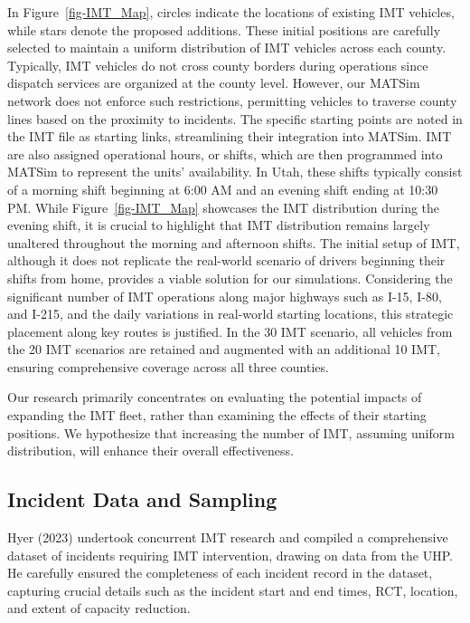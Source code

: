 \documentclass[fancy, oneside, mastersfancy, ms]{byuthesis}
\begin{document}
In Figure~\ref{fig-IMT_Map}, circles indicate the locations of existing
IMT vehicles, while stars denote the proposed additions. These initial
positions are carefully selected to maintain a uniform distribution of
IMT vehicles across each county. Typically, IMT vehicles do not cross
county borders during operations since dispatch services are organized
at the county level. However, our MATSim network does not enforce such
restrictions, permitting vehicles to traverse county lines based on the
proximity to incidents. The specific starting points are noted in the
IMT file as starting links, streamlining their integration into MATSim.
IMT are also assigned operational hours, or shifts, which are then
programmed into MATSim to represent the units' availability. In Utah,
these shifts typically consist of a morning shift beginning at 6:00 AM
and an evening shift ending at 10:30 PM. While Figure~\ref{fig-IMT_Map}
showcases the IMT distribution during the evening shift, it is crucial
to highlight that IMT distribution remains largely unaltered throughout
the morning and afternoon shifts. The initial setup of IMT, although it
does not replicate the real-world scenario of drivers beginning their
shifts from home, provides a viable solution for our simulations.
Considering the significant number of IMT operations along major
highways such as I-15, I-80, and I-215, and the daily variations in
real-world starting locations, this strategic placement along key routes
is justified. In the 30 IMT scenario, all vehicles from the 20 IMT
scenarios are retained and augmented with an additional 10 IMT, ensuring
comprehensive coverage across all three counties.

Our research primarily concentrates on evaluating the potential impacts
of expanding the IMT fleet, rather than examining the effects of their
starting positions. We hypothesize that increasing the number of IMT,
assuming uniform distribution, will enhance their overall effectiveness.

\hypertarget{sec-inc_data}{%
\subsection{Incident Data and Sampling}\label{sec-inc_data}}

Hyer (2023) undertook concurrent IMT research and compiled a
comprehensive dataset of incidents requiring IMT intervention, drawing
on data from the UHP. He carefully ensured the completeness of each
incident record in the dataset, capturing crucial details such as the
incident start and end times, RCT, location, and extent of capacity
reduction.
\end{document}

